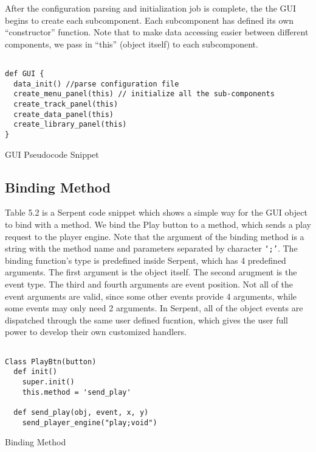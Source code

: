 After the configuration parsing and initialization job is complete, the 
the GUI begins to create each subcomponent. Each subcomponent has defined its 
own ``constructor'' function. Note that to make data accessing easier 
between different components, we pass in ``this'' (object itself) to each  
subcomponent.
\begin{table}[htdp]
\centering
\begin{lstlisting}

def GUI {
  data_init() //parse configuration file
  create_menu_panel(this) // initialize all the sub-components
  create_track_panel(this)
  create_data_panel(this)
  create_library_panel(this)
}

\end{lstlisting}
\caption[GUI Pseudocode Snippet]{GUI Pseudocode Snippet}
\end{table}

\subsection{Binding Method}
Table 5.2 is a Serpent code snippet which shows a simple way for the GUI object 
to bind with a method. We bind the Play button to a method, which sends a play 
request to the player engine. Note that the argument of the binding method is 
a string with the method name and parameters
separated by character \texttt{`;'}. The binding function's type is predefined 
inside Serpent, which has 4 predefined arguments. The first argument is the object 
itself. The second arugment is the event type. The third and fourth arguments are 
event position.
Not all of the event arguments are valid, since some other events provide 4 arguments, 
while some events may only need 2 arguments. In Serpent, all of the object events 
are dispatched through the same user defined fucntion, which gives the user full 
power to develop their own customized handlers.

\begin{table}[htdp]
\centering
\begin{lstlisting}

Class PlayBtn(button)
  def init()
    super.init()
    this.method = 'send_play'

  def send_play(obj, event, x, y)
    send_player_engine("play;void")

\end{lstlisting}
\caption[Binding Method]{Binding Method}
\end{table}

